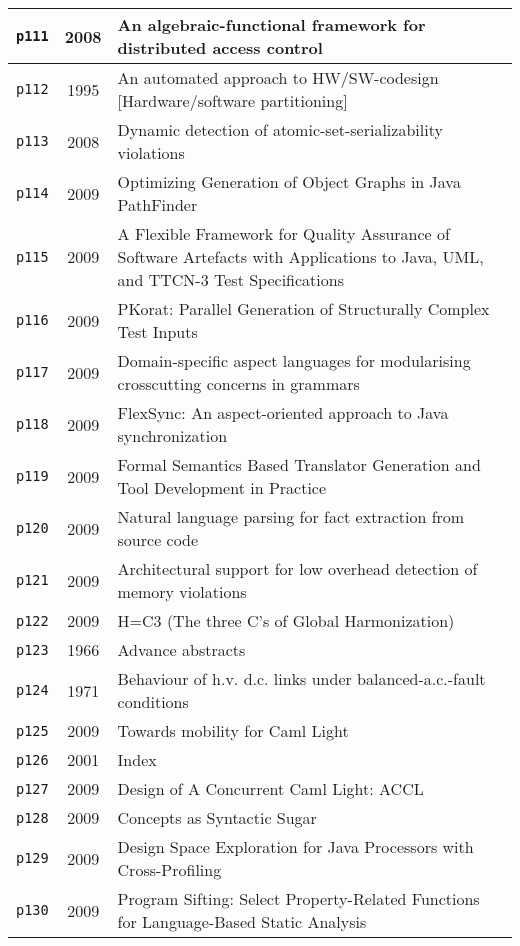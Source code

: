 \begin{longtable}{| c | c | p{16cm} |}
  \hline
  \texttt{p111} & 2008 & An algebraic-functional framework for distributed access control \\
  \hline
  \texttt{p112} & 1995 & An automated approach to HW/SW-codesign [Hardware/software partitioning] \\
  \hline
  \texttt{p113} & 2008 & Dynamic detection of atomic-set-serializability violations \\
  \hline
  \texttt{p114} & 2009 & Optimizing Generation of Object Graphs in Java PathFinder \\
  \hline
  \texttt{p115} & 2009 & A Flexible Framework for Quality Assurance of Software Artefacts with Applications to Java, UML, and TTCN-3 Test Specifications \\
  \hline
  \texttt{p116} & 2009 & PKorat: Parallel Generation of Structurally Complex Test Inputs \\
  \hline
  \texttt{p117} & 2009 & Domain-specific aspect languages for modularising crosscutting concerns in grammars \\
  \hline
  \texttt{p118} & 2009 & FlexSync: An aspect-oriented approach to Java synchronization \\
  \hline
  \texttt{p119} & 2009 & Formal Semantics Based Translator Generation and Tool Development in Practice \\
  \hline
  \texttt{p120} & 2009 & Natural language parsing for fact extraction from source code \\
  \hline
  \texttt{p121} & 2009 & Architectural support for low overhead detection of memory violations \\
  \hline
  \texttt{p122} & 2009 & H=C3 (The three C's of Global Harmonization) \\
  \hline
  \texttt{p123} & 1966 & Advance abstracts \\
  \hline
  \texttt{p124} & 1971 & Behaviour of h.v. d.c. links under balanced-a.c.-fault conditions \\
  \hline
  \texttt{p125} & 2009 & Towards mobility for Caml Light \\
  \hline
  \texttt{p126} & 2001 & Index \\
  \hline
  \texttt{p127} & 2009 & Design of A Concurrent Caml Light: ACCL \\
  \hline
  \texttt{p128} & 2009 & Concepts as Syntactic Sugar \\
  \hline
  \texttt{p129} & 2009 & Design Space Exploration for Java Processors with Cross-Profiling \\
  \hline
  \texttt{p130} & 2009 & Program Sifting: Select Property-Related Functions for Language-Based Static Analysis \\

\end{longtable}
